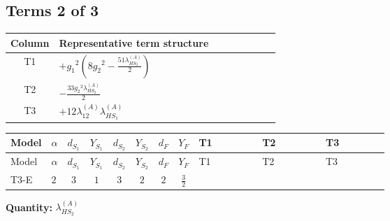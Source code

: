 \documentclass[8pt]{article}
\begin{document}
\begin{landscape}
\subsection*{Terms 2 of 3}
\begin{center}
\begin{tabular}{@{}c >{\raggedright\arraybackslash}p{0.82\linewidth}@{}}
\toprule
Column & Representative term structure \\
\midrule
T1 & \(\displaystyle +{g_1}^2 \left(8 {g_2}^2-\frac{51 {\lambda_{HS_2}^{(A)}}}{2}\right)\) \\
\midrule
T2 & \(\displaystyle -\frac{33 {g_2}^2 {\lambda_{HS_2}^{(A)}}}{2}\) \\
\midrule
T3 & \(\displaystyle +12 {\lambda_{12}^{(A)}} {\lambda_{HS_1}^{(A)}}\) \\
\midrule
\bottomrule
\end{tabular}
\end{center}
\smallskip
\tiny
\begin{longtable}{@{}llcccccc >{\raggedright\arraybackslash}p{0.21\linewidth} >{\raggedright\arraybackslash}p{0.21\linewidth} >{\raggedright\arraybackslash}p{0.21\linewidth}@{}}
\toprule
Model & $\alpha$ & $d_{S_1}$ & $Y_{S_1}$ & $d_{S_2}$ & $Y_{S_2}$ & $d_F$ & $Y_F$ & T1 & T2 & T3 \\
\midrule
\endfirsthead
\toprule
Model & $\alpha$ & $d_{S_1}$ & $Y_{S_1}$ & $d_{S_2}$ & $Y_{S_2}$ & $d_F$ & $Y_F$ & T1 & T2 & T3 \\
\midrule
\endhead
T3-E & $2$ & $3$ & $1$ & $3$ & $2$ & $2$ & $\frac{3}{2}$ & \scriptsize\adjustbox{max width=\linewidth}{$\begin{gathered} +{g_1}^2 \left(8 {g_2}^2-\frac{51 {\lambda_{HS_2}^{(A)}}}{2}\right)\end{gathered}$} & \scriptsize\adjustbox{max width=\linewidth}{$\begin{gathered} -\frac{33 {g_2}^2 {\lambda_{HS_2}^{(A)}}}{2}\end{gathered}$} & \scriptsize\adjustbox{max width=\linewidth}{$\begin{gathered} +12 {\lambda_{12}^{(A)}} {\lambda_{HS_1}^{(A)}}\end{gathered}$} \\
\midrule
\bottomrule
\end{longtable}
\clearpage
\noindent\textbf{Quantity: }$\lambda_{HS_2}^{(A)}$\par\smallskip

\end{landscape}
\end{document}
